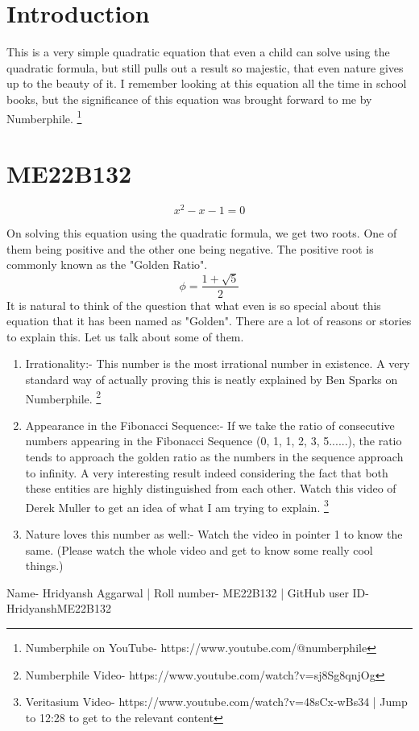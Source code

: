 \section{Introduction}

This is a very simple quadratic equation that even a child can solve using the quadratic formula, but still pulls out a result so majestic, that even nature gives up to the beauty of it. I remember looking at this equation all the time in school books, but the significance of this equation was brought forward to me by Numberphile. \footnote{Numberphile on YouTube- https://www.youtube.com/@numberphile}

\section{ME22B132}

\begin{equation}
    x^2-x-1=0
\end{equation}

On solving this equation using the quadratic formula, we get two roots. One of them being positive and the other one being negative. The positive root is commonly known as the "Golden Ratio".
\begin{equation}
    \phi = \frac{1+\sqrt{5}}{2}
\end{equation}
It is natural to think of the question that what even is so special about this equation that it has been named as "Golden".
There are a lot of reasons or stories to explain this. Let us talk about some of them.
\begin{enumerate}
    \item Irrationality:- This number is the most irrational number in existence. A very standard way of actually proving this is neatly explained by Ben Sparks on Numberphile. \footnote{Numberphile Video- https://www.youtube.com/watch?v=sj8Sg8qnjOg}
    \item Appearance in the Fibonacci Sequence:- If we take the ratio of consecutive numbers appearing in the Fibonacci Sequence (0, 1, 1, 2, 3, 5......), the ratio tends to approach the golden ratio as the numbers in the sequence approach to infinity. A very interesting result indeed considering the fact that both these entities are highly distinguished from each other. Watch this video of Derek Muller to get an idea of what I am trying to explain. \footnote{Veritasium Video- https://www.youtube.com/watch?v=48sCx-wBs34 | Jump to 12:28 to get to the relevant content}
    \item Nature loves this number as well:- Watch the video in pointer 1 to know the same. (Please watch the whole video and get to know some really cool things.)
\end{enumerate}
Name- Hridyansh Aggarwal | Roll number- ME22B132 | GitHub user ID- HridyanshME22B132

